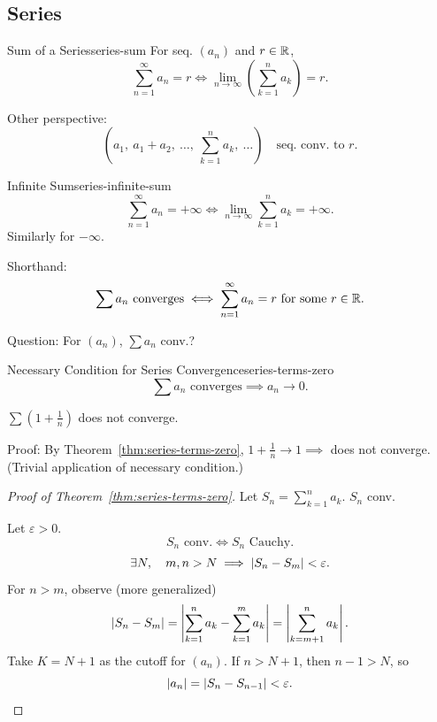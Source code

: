 \subsection{Series}

\begin{definition}{Sum of a Series}{series-sum}
  For seq. $(a_n)$ and $r\in\mathbb{R}$,
  \[
    \sum_{n=1}^{\infty}a_n=r
    \iff \lim_{n\to\infty}\left(\sum_{k=1}^{n}a_k\right)=r.
  \]
\end{definition}

Other perspective:
\[
  \left(a_1,\ a_1+a_2,\ \ldots,\ \sum_{k=1}^{n}a_k,\ \ldots\right)
  \quad\text{seq. conv. to }r.
\]

\begin{definition}{Infinite Sum}{series-infinite-sum}
  \[
    \sum_{n=1}^{\infty}a_n=+\infty
    \iff \lim_{n\to\infty}\sum_{k=1}^{n}a_k=+\infty.
  \]
  Similarly for $-\infty$.
\end{definition}

Shorthand:
\[
  \sum a_n\text{ converges}
  \iff \sum_{n=1}^{\infty}a_n=r\text{ for some }r\in\mathbb{R}.
\]

Question: For $(a_n)$, $\sum a_n$ conv.?

\begin{theorem}{Necessary Condition for Series Convergence}{series-terms-zero}
  \[
    \sum a_n\text{ converges}\implies a_n\to0.
  \]
\end{theorem}

\begin{example}
  $\sum (1+\frac1n)$ does not converge.

  Proof: By Theorem~\ref{thm:series-terms-zero},
  $1+\frac1n\to1\implies$ does not converge.\\
  (Trivial application of necessary condition.)
\end{example}

\begin{proof}[Proof of Theorem~\ref{thm:series-terms-zero}]
  Let $S_n=\sum_{k=1}^{n}a_k$. $S_n$ conv.


  Let $\varepsilon>0$.
  \[
    S_n\text{ conv.}\iff S_n\text{ Cauchy}.
  \]
  \[
    \exists N,\quad m,n>N\implies\left\lvert S_n-S_m \right\rvert<\varepsilon.
  \]
  For $n>m$, observe (more generalized)
  \[
    \left\lvert S_n-S_m \right\rvert
    =\left|\sum_{k=1}^{n}a_k-\sum_{k=1}^{m}a_k\right|
    =\left|\sum_{k=m+1}^{n}a_k\right|.
  \]
  Take $K=N+1$ as the cutoff for $(a_n)$. If $n>N+1$, then $n-1>N$, so
  \[
    \left\lvert a_n \right\rvert=\left\lvert S_n-S_{n-1} \right\rvert<\varepsilon.
  \]
\end{proof}

